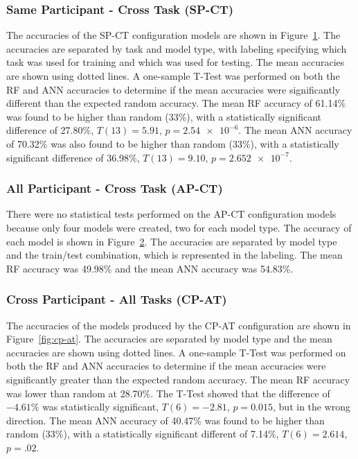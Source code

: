 \documentclass[11pt]{article}
\begin{document}
		\subsubsection{Same Participant - Cross Task (SP-CT)}
		The accuracies of the SP-CT configuration models are shown in Figure~\ref{fig:sp-ct}. The accuracies are separated by task and model type, with labeling specifying which task was used for training and which was used for testing. The mean accuracies are shown using dotted lines. A one-sample T-Test was performed on both the RF and ANN accuracies to determine if the mean accuracies were significantly different than the expected random accuracy. The mean RF accuracy of 61.14\% was found to be higher than random (33\%), with a statistically significant difference of 27.80\%, \(T(13) = 5.91\), \(p = \num{2.54e-6}\). The mean ANN accuracy of 70.32\% was also found to be higher than random (33\%), with a statistically significant difference of 36.98\%, \(T(13) = 9.10\), \(p = \num{2.652e-7}\).
		
		\begin{figure}
		\centering
		\caption{}
		\label{fig:sp-ct}
		\end{figure} 
		
		\subsubsection{All Participant - Cross Task (AP-CT)}
		There were no statistical tests performed on the AP-CT configuration models because only four models were created, two for each model type. The accuracy of each model is shown in Figure~\ref{fig:ap-ct}. The accuracies are separated by model type and the train/test combination, which is represented in the labeling. The mean RF accuracy was 49.98\% and the mean ANN accuracy was 54.83\%.
		
		\begin{figure}
		\centering
		\caption{}
		\label{fig:ap-ct}
		\end{figure} 
		
		\subsubsection{Cross Participant - All Tasks (CP-AT)}
		The accuracies of the models produced by the CP-AT configuration are shown in Figure~\ref{fig:cp-at}. The accuracies are separated by model type and the mean accuracies are shown using dotted lines. A one-sample T-Test was performed on both the RF and ANN accuracies to determine if the mean accuracies were significantly greater than the expected random accuracy. The mean RF accuracy was lower than random at 28.70\%. The T-Test showed that the difference of \(-4.61\%\) was statistically significant, \(T(6) = -2.81\), \(p = 0.015\), but in the wrong direction. The mean ANN accuracy of 40.47\% was found to be higher than random (33\%), with a statistically significant different of 7.14\%, \(T(6) = 2.614\), \(p = .02\).
		
\end{document}
